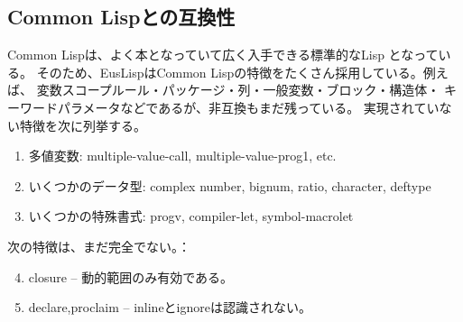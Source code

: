 \subsection{Common Lispとの互換性}

Common Lispは、よく本となっていて広く入手できる標準的なLisp\cite{CLtL,CLtL2}
となっている。
そのため、EusLispはCommon Lispの特徴をたくさん採用している。例えば、
変数スコープルール・パッケージ・列・一般変数・ブロック・構造体・
キーワードパラメータなどであるが、非互換もまだ残っている。
実現されていない特徴を次に列挙する。

\begin{enumerate}
\item 多値変数:
      multiple-value-call, multiple-value-prog1, etc.
\item いくつかのデータ型:
      complex number, bignum, ratio, character, deftype
\item いくつかの特殊書式:
      progv, compiler-let, symbol-macrolet
\end{enumerate}

次の特徴は、まだ完全でない。：
\begin{enumerate}
\setcounter{enumi}{3}
\item  closure -- 動的範囲のみ有効である。
\item  declare,proclaim -- inlineとignoreは認識されない。
\end{enumerate}

